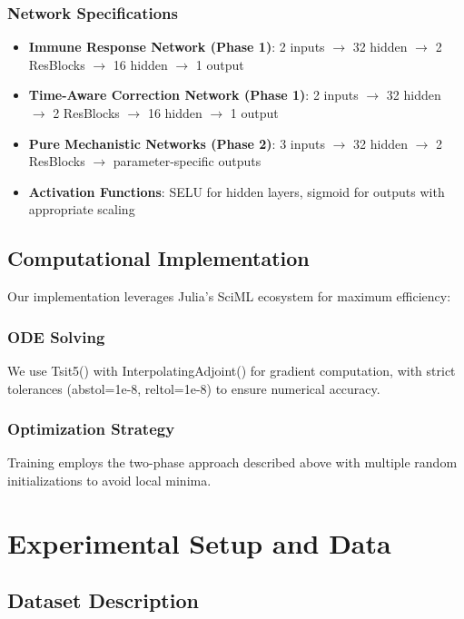 \documentclass{juliacon}
\begin{document}
\subsubsection{Network Specifications}
\begin{itemize}
    \item \textbf{Immune Response Network (Phase 1)}: 2 inputs $\rightarrow$ 32 hidden $\rightarrow$ 2 ResBlocks $\rightarrow$ 16 hidden $\rightarrow$ 1 output
    \item \textbf{Time-Aware Correction Network (Phase 1)}: 2 inputs $\rightarrow$ 32 hidden $\rightarrow$ 2 ResBlocks $\rightarrow$ 16 hidden $\rightarrow$ 1 output
    \item \textbf{Pure Mechanistic Networks (Phase 2)}: 3 inputs $\rightarrow$ 32 hidden $\rightarrow$ 2 ResBlocks $\rightarrow$ parameter-specific outputs
    \item \textbf{Activation Functions}: SELU for hidden layers, sigmoid for outputs with appropriate scaling
\end{itemize}

\subsection{Computational Implementation}

Our implementation leverages Julia's SciML ecosystem for maximum efficiency:

\subsubsection{ODE Solving}
We use Tsit5() with InterpolatingAdjoint() for gradient computation, with strict tolerances (abstol=1e-8, reltol=1e-8) to ensure numerical accuracy.

\subsubsection{Optimization Strategy}
Training employs the two-phase approach described above with multiple random initializations to avoid local minima.

\section{Experimental Setup and Data}

\subsection{Dataset Description}
\end{document}
